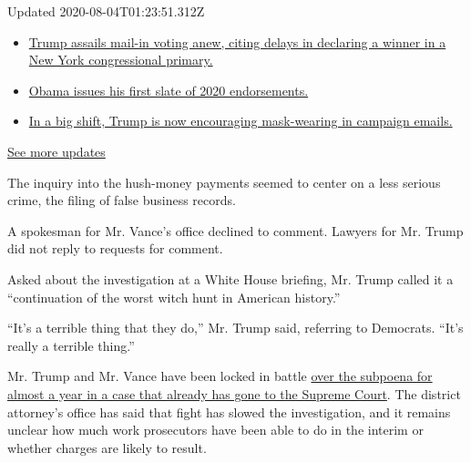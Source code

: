 Updated 2020-08-04T01:23:51.312Z

\begin{itemize}
\tightlist
\item
  \href{https://www.nytimes3xbfgragh.onion/2020/08/03/us/elections/biden-vs-trump.html?action=click\&pgtype=Article\&state=default\&region=MAIN_CONTENT_1\&context=storylines_live_updates\#link-6494b448}{Trump
  assails mail-in voting anew, citing delays in declaring a winner in a
  New York congressional primary.}
\item
  \href{https://www.nytimes3xbfgragh.onion/2020/08/03/us/elections/biden-vs-trump.html?action=click\&pgtype=Article\&state=default\&region=MAIN_CONTENT_1\&context=storylines_live_updates\#link-3de249e6}{Obama
  issues his first slate of 2020 endorsements.}
\item
  \href{https://www.nytimes3xbfgragh.onion/2020/08/03/us/elections/biden-vs-trump.html?action=click\&pgtype=Article\&state=default\&region=MAIN_CONTENT_1\&context=storylines_live_updates\#link-54e34d20}{In
  a big shift, Trump is now encouraging mask-wearing in campaign
  emails.}
\end{itemize}

\href{https://www.nytimes3xbfgragh.onion/2020/08/03/us/elections/biden-vs-trump.html?action=click\&pgtype=Article\&state=default\&region=MAIN_CONTENT_1\&context=storylines_live_updates}{See
more updates}

The inquiry into the hush-money payments seemed to center on a less
serious crime, the filing of false business records.

A spokesman for Mr. Vance's office declined to comment. Lawyers for Mr.
Trump did not reply to requests for comment.

Asked about the investigation at a White House briefing, Mr. Trump
called it a ``continuation of the worst witch hunt in American
history.''

``It's a terrible thing that they do,'' Mr. Trump said, referring to
Democrats. ``It's really a terrible thing.''

Mr. Trump and Mr. Vance have been locked in battle
\href{https://www.nytimes3xbfgragh.onion/interactive/2018/10/02/us/politics/donald-trump-tax-schemes-fred-trump.html}{over
the subpoena for almost a year in a case that already has gone to the
Supreme Court}. The district attorney's office has said that fight has
slowed the investigation, and it remains unclear how much work
prosecutors have been able to do in the interim or whether charges are
likely to result.

